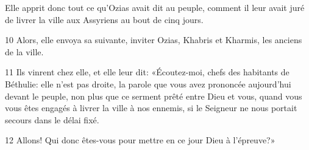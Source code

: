 
Elle apprit donc tout ce qu'Ozias avait dit au peuple, comment il leur avait juré de livrer la ville aux Assyriens au bout de cinq jours.

10 Alors, elle envoya sa suivante, inviter Ozias, Khabris et Kharmis, les anciens de la ville.

11 Ils vinrent chez elle, et elle leur dit: «Écoutez-moi, chefs des habitants de Béthulie: elle n'est pas droite, la parole que vous avez prononcée aujourd'hui devant le peuple, non plus que ce serment prêté entre Dieu et vous, quand vous vous êtes engagés à livrer la ville à nos ennemis, si le Seigneur ne nous portait secours dans le délai fixé.

12 Allons! Qui donc êtes-vous pour mettre en ce jour Dieu à l'épreuve?»
